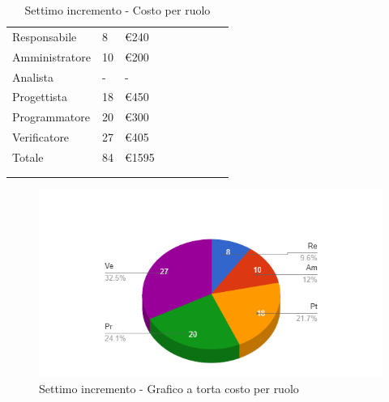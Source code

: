 {{\begin{longtable}{C{.4\freewidth} C{.2\freewidth} C{.2\freewidth} C{.2\freewidth} C{.2\freewidth} C{.2\freewidth} C{.2\freewidth} C{.2\freewidth} C{.2\freewidth}}
        Responsabile  & 8 & €240\\
        Amministratore  & 10 & €200 \\
        Analista &- & -\\
        Progettista &18 &€450\\
        Programmatore &20 & €300\\
        Verificatore &27 &€405\\
        Totale&84&€1595\\
        \bottomrule
      \\
        \caption{Settimo incremento - Costo per ruolo} 

        \end{longtable}

        \begin{figure}[H]
          \includegraphics[width=15cm]{sezioni/Images/settimoT.png}
          \centering
          \caption{Settimo incremento - Grafico a torta costo per ruolo}
       \end{figure}
    }
    }

